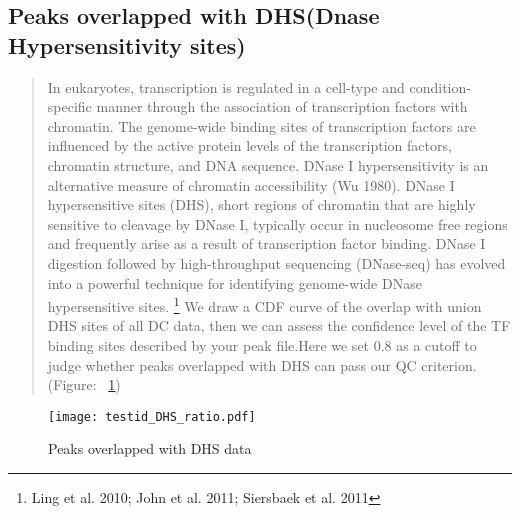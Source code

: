 \documentclass[11pt,a4paper]{article}
\begin{document}
\subsection{Peaks overlapped with DHS(Dnase Hypersensitivity sites)}
\begin{quotation}
In eukaryotes, transcription is regulated in a cell-type and condition-specific manner through the association of transcription factors with chromatin. The genome-wide binding sites of transcription factors are influenced by the active protein levels of the transcription factors, chromatin structure, and DNA sequence.
DNase I hypersensitivity is an alternative measure of chromatin accessibility (Wu 1980). DNase I hypersensitive sites (DHS), short regions of chromatin that are highly sensitive to cleavage by DNase I, typically occur in nucleosome free regions and frequently arise as a result of transcription factor binding. DNase I digestion followed by high-throughput sequencing (DNase-seq) has evolved into a powerful technique for identifying genome-wide DNase hypersensitive sites. \footnote{Ling et al. 2010; John et al. 2011; Siersbaek et al. 2011}
We draw a CDF curve of the overlap with union DHS sites of all DC data, then we can assess the confidence level of  the TF binding sites described by your peak file.Here we set 0.8 as a cutoff to judge whether peaks overlapped with DHS can pass our QC criterion. (Figure: ~\ref{DHS})
\end{quotation}
\begin{figure}[h]
\begin{center}
\caption{Peaks overlapped with DHS data} \label{DHS}
{\texttt{[image: testid\_DHS\_ratio.pdf]}}
\end{center}
\end{figure}
\newpage		
\end{document}
